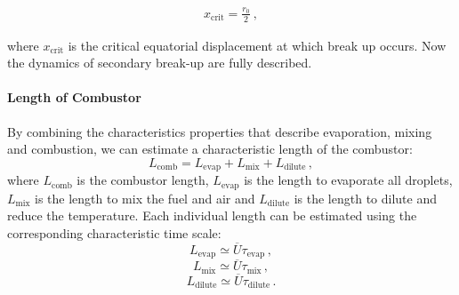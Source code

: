 \begin{equation}
	\begin{aligned}
    	x_\mathrm{crit} = \frac{r_0}{2}\ ,
    \end{aligned}
\end{equation}

where $x_\mathrm{crit}$ is the critical equatorial displacement at which break up occurs. Now the dynamics of secondary break-up are fully described. 

\paragraph{Length of Combustor}
By combining the characteristics properties that describe evaporation, mixing and combustion, we can estimate a characteristic length of the combustor:
\begin{equation}
  L_\text{comb} = L_\text{evap} + L_\text{mix} + L_\text{dilute}\,,
\end{equation}
where $L_\text{comb}$ is the combustor length, $L_\text{evap}$ is the length to evaporate all droplets, $L_\text{mix}$ is the length to mix the fuel and air and $L_\text{dilute}$ is the length to dilute and reduce the temperature. Each individual length can be estimated using the corresponding characteristic time scale:
\[
L_\text{evap} \simeq \overline{U} \tau_\text{evap}\,,
\]
\[
L_\text{mix} \simeq \overline{U} \tau_\text{mix}\,,
\]
\[
L_\text{dilute} \simeq \overline{U} \tau_\text{dilute}\,.
\]

